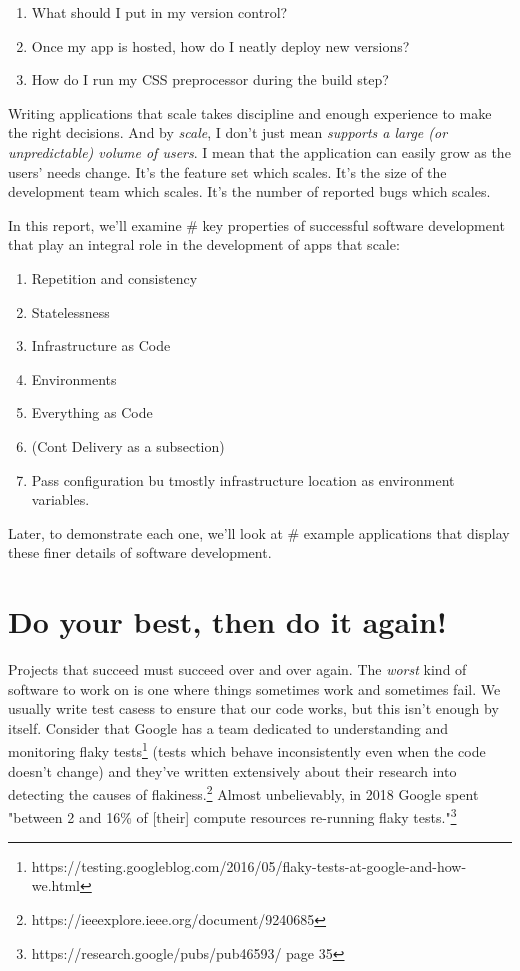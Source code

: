 \documentclass{article}
\newcommand{\noterm}[1]{\textit{#1}}
\newcommand{\term}[1]{\noterm{#1}\index{#1}}
\begin{document}
\begin{enumerate}
  \item What should I put in my version control?
  \item Once my app is hosted, how do I neatly deploy new versions?
  \item How do I run my CSS preprocessor during the build step?
\end{enumerate}
Writing applications that scale takes discipline and enough experience to make the right decisions.
And by \term{scale}, I don't just mean \noterm{supports a large (or unpredictable) volume of users}.
I mean that the application can easily grow as the users' needs change.
It's the feature set which scales.
It's the size of the development team which scales.
It's the number of reported bugs which scales.

In this report, we'll examine \# key properties of successful software development that play an integral role in the development of apps that scale:

\begin{enumerate}
  \item Repetition and consistency
  \item Statelessness
  \item Infrastructure as Code
  \item Environments
  \item Everything as Code
  \item (Cont Delivery as a subsection)
  \item Pass configuration bu tmostly infrastructure location as environment variables.
\end{enumerate}
Later, to demonstrate each one, we'll look at \# example applications that display these finer details of software development.

\section{Do your best, then do it again!}

Projects that succeed must succeed over and over again.
The \textit{worst} kind of software to work on is one where things sometimes work and sometimes fail.
We usually write test casess to ensure that our code works, but this isn't enough by itself.
Consider that Google has a team dedicated to understanding and monitoring flaky tests\footnote{https://testing.googleblog.com/2016/05/flaky-tests-at-google-and-how-we.html} (tests which behave inconsistently even when the code doesn't change) and they've written extensively about their research into detecting the causes of flakiness.\footnote{https://ieeexplore.ieee.org/document/9240685}
Almost unbelievably, in 2018 Google spent "between 2 and 16\% of [their] compute resources re-running flaky tests."\footnote{https://research.google/pubs/pub46593/ page 35}
\end{document}
